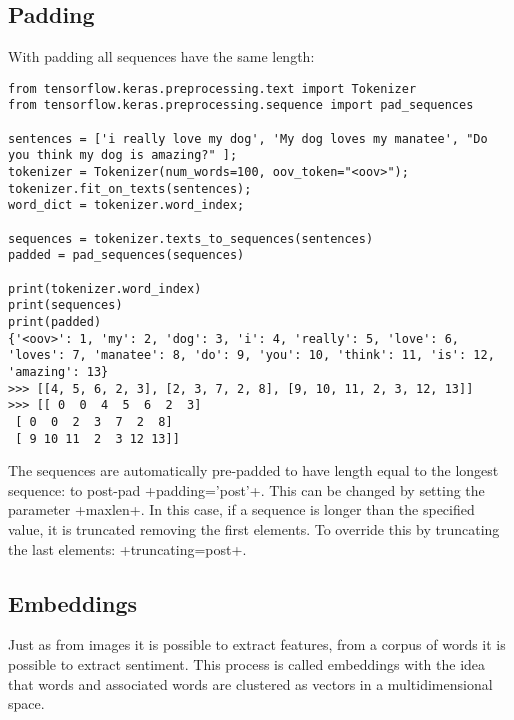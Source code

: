 \subsection{Padding}
With padding all sequences have the same length:
\begin{lstlisting}
from tensorflow.keras.preprocessing.text import Tokenizer
from tensorflow.keras.preprocessing.sequence import pad_sequences

sentences = ['i really love my dog', 'My dog loves my manatee', "Do you think my dog is amazing?" ];
tokenizer = Tokenizer(num_words=100, oov_token="<oov>");
tokenizer.fit_on_texts(sentences);
word_dict = tokenizer.word_index;

sequences = tokenizer.texts_to_sequences(sentences)
padded = pad_sequences(sequences)

print(tokenizer.word_index)
print(sequences)
print(padded)
{'<oov>': 1, 'my': 2, 'dog': 3, 'i': 4, 'really': 5, 'love': 6, 'loves': 7, 'manatee': 8, 'do': 9, 'you': 10, 'think': 11, 'is': 12, 'amazing': 13}
>>> [[4, 5, 6, 2, 3], [2, 3, 7, 2, 8], [9, 10, 11, 2, 3, 12, 13]]
>>> [[ 0  0  4  5  6  2  3]
 [ 0  0  2  3  7  2  8]
 [ 9 10 11  2  3 12 13]]
 \end{lstlisting}
The sequences are automatically pre-padded to have length equal to the longest sequence: to post-pad \cd+padding='post'+. This can be changed by setting the parameter \cd+maxlen+. In this case, if a sequence is longer than the specified value, it is truncated removing the first elements. To override this by truncating the last elements: \cd+truncating=post+.



\subsection{Embeddings}
Just as from images it is possible to extract features, from a corpus of words it is possible to extract sentiment.
This process is called embeddings with the idea that words and associated words are clustered as vectors in a multidimensional space.


